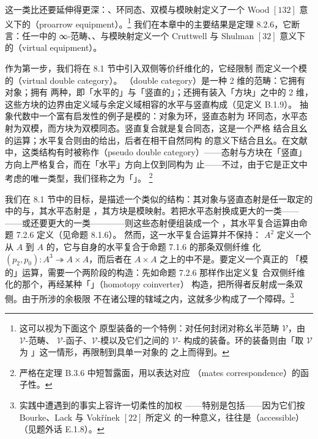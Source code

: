 这一类比还要延伸得更深：\trUnitalRing、环同态、双模与模映射定义了一个 Wood $[132]$
意义下的\emph{\trProarrowEquipment}（proarrow equipment）。\footnote{这可以视为下面这个
原型装备的一个特例：对任何封闭对称幺半范畴 $\mathcal{V}$，由 $\mathcal{V}$-范畴、
$\mathcal{V}$-函子、$\mathcal{V}$-模以及它们之间的 $\mathcal{V}$-%
\trNaturalTransformation{}构成的装备。环的装备则由「取 $\mathcal{V}$ 为%
\trAbelianGroup{}\trCategory」这一情形，再限制到具单一对象的%
\trAbelianGroup{}\trEnrichedCategory{}之上而得到。}
我们在本章中的主要结果是定理 8.2.6，它断言：任一\trInfinityCosmos{}中的
∞-范畴、\trFunctor、\trModule{}与模映射定义一个 Cruttwell 与 Shulman $[32]$
意义下的\emph{\trVirtualEquipment}（virtual equipment）。

作为第一步，我们将在 8.1 节中引入双侧等价纤维化的\trDoubleCategory，它经限制
而定义一个模的\emph{\trVirtualDoubleCategory}（virtual double category）。
\emph{\trDoubleCategory}（double category）是一种 2 维的范畴：它拥有对象；拥有
两种\trOneMorphism{}，即「水平的」与「竖直的」；还拥有装入「方块」之中的 2 维\trCell，
这些方块的边界由定义域与余定义域相容的水平与竖直\trOneMorphism{}构成（见定义 B.1.9）。
抽象代数中一个富有启发性的例子是模的\trDoubleCategory：对象为环，竖直态射为
环同态，水平态射为双模，而方块为双模同态。竖直复合就是复合同态，这是一个严格
结合且幺的运算；水平复合则由\trModule{}的\trTensorProduct{}给出，后者在相干自然同构
的意义下结合且幺。在文献中，这类结构有时被称作\emph{\trPseudoDoubleCategory}（pseudo double category）——态射与方块在「竖直」方向上严格复合，而在「水平」方向上仅到同构为
止——不过，由于它是正文中考虑的唯一类型，我们径称之为「\trDoubleCategory」。
\footnote{严格\trDoubleCategory{}在定理 B.3.6 中短暂露面，用以表达对应
（mates correspondence）的函子性。}

我们在 8.1 节中的目标，是描述一个类似的结构：其对象与竖直态射是任一取定的%
\trInfinityCosmos{}中的\trInfinityCategories{}与\trFunctor，其水平态射是%
\trModule，其方块是模映射。若把水平态射换成更大的一类——\trTwoSidedFibration
——或还要更大的一类——\trTwoSidedIsofibration——则这些态射便组装成一个%
\trDoubleCategory，其水平复合运算由命题 7.2.6 定义（见命题 8.1.6）。
然而，这一水平复合运算并不保持\trModule：\trArrowInfinityCategory{} $A^{2}$ 定义一个从 $A$ 到
$A$ 的\trModule，它与自身的水平复合\trEquivalence{}于命题 7.1.6 的那条双侧纤维
化 $(p_{2},p_{0})\colon A^{3}\twoheadrightarrow A\times A$，而后者在
$A\times A$ 之上的\trSliceInfinityCosmos{}中不是\trDiscrete。要定义一个真正的
「模的\trTensorProduct{}」运算，需要一个两阶段的构造：先如命题 7.2.6 那样作出定义复
合双侧纤维化的那个\trPullback，再经某种「\trHomotopyCoinverter{}」（homotopy coinverter）
构造，把所得者反射成一条\emph{\trDiscrete{}}双侧\trFibration。由于所涉的余极限
不在\trInfinityCosmos{}诸公理的辖域之内，这就多少构成了一个障碍。\footnote{%
实践中遭遇到的\trInfinityCosmos{}事实上容许一切柔性的加权\trHomotopy\trColimit
——特别是包括\trHomotopyCoinverter{}——因为它们按 Bourke、Lack 与 Vokřínek $[22]$ 所定义
的一种意义，往往是\emph{\trAccessible}（accessible）（见题外话 E.1.8）。}

